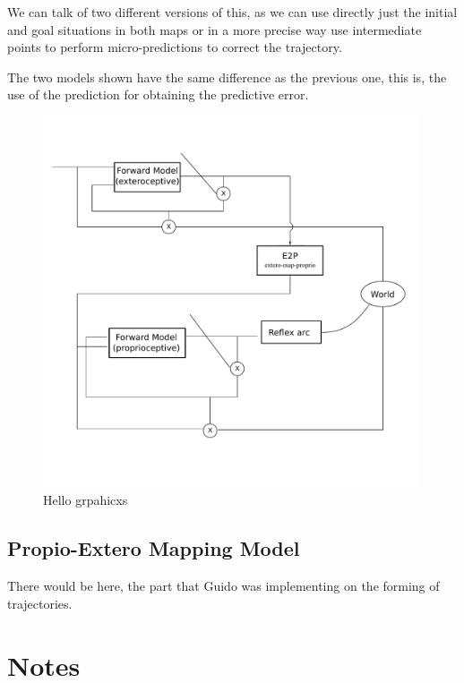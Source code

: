 \documentclass[11pt]{llncs}
\begin{document}
We can talk of two different versions of this, as we can use directly just the
initial and goal situations in both maps or in a more precise way use
intermediate points to perform micro-predictions to correct the trajectory.

The two models shown have the same difference as the previous one, this is,
the use of the prediction for obtaining the predictive error.


\begin{figure}
  \includegraphics[width=0.99\textwidth]{img/actinf_large_diagram_p_e2p_e.pdf}
  \caption{Hello grpahicxs}
\end{figure}

\subsection{Propio-Extero Mapping Model}
\label{subsec:exteropropio}


There would be here, the part that Guido was implementing on the forming of trajectories.




\section{Notes}
\label{sec:org863d8de}
\end{document}
